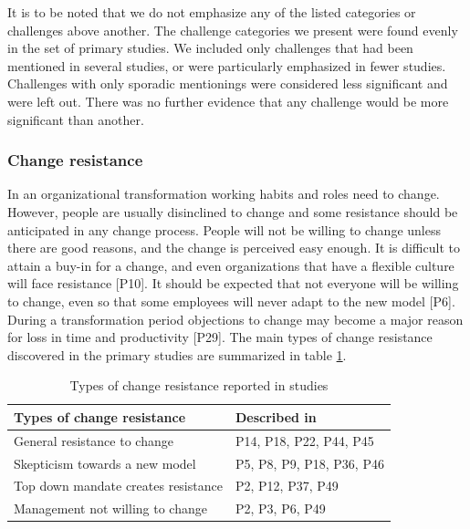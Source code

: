 \documentclass[preprint,authoryear,12pt]{elsarticle}
\begin{document}
It is to be noted that we do not emphasize any of the listed categories or
challenges above another. The challenge categories we present were found evenly
in the set of primary studies. We included only challenges that had been
mentioned in several studies, or were particularly emphasized in fewer studies.
Challenges with only sporadic mentionings were considered less significant and
were left out. There was no further evidence that any challenge would be more
significant than another.


\subsubsection{Change resistance}

In an organizational transformation working habits and roles need to change.
However, people are usually disinclined to change and some resistance should be
anticipated in any change process. People will not be willing to change unless
there are good reasons, and the change is perceived easy enough. It is difficult
to attain a buy-in for a change, and even organizations that have a flexible
culture will face resistance [P10]. It should be expected that not everyone will
be willing to change, even so that some employees will never adapt to the new
model [P6]. During a transformation period objections to change may become a
major reason for loss in time and productivity [P29]. The main types of change
resistance discovered in the primary studies are summarized in table
\ref{table:challenges_changeresistance}.

\begin{table}[b]
    \centering
    \begin{tabular}{ l l }
        \toprule
        Types of change resistance           &  Described in  \\
        \midrule
        General resistance to change         &  P14, P18, P22, P44, P45   \\
        Skepticism towards a new model       &  P5, P8, P9, P18, P36, P46 \\
        Top down mandate creates resistance  &  P2, P12, P37, P49 \\
        Management not willing to change     &  P2, P3, P6, P49 \\
        \bottomrule
    \end{tabular}
    \caption{Types of change resistance reported in studies}
    \label{table:challenges_changeresistance}
\end{table}
\end{document}
